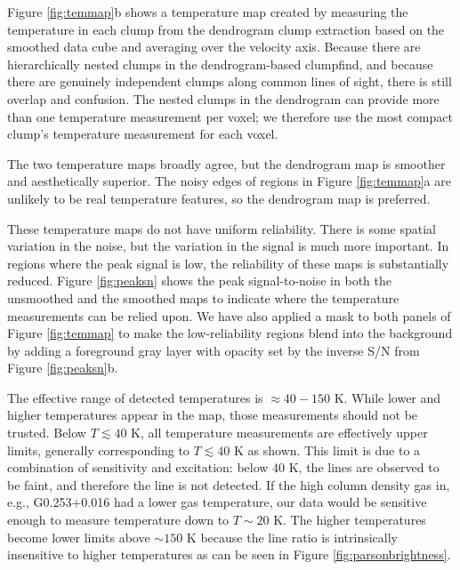 Figure \ref{fig:temmap}b shows a temperature map created by measuring the
temperature in each clump from the dendrogram clump extraction based on the
smoothed data cube and averaging over the velocity axis.  Because there are
hierarchically nested clumps in the dendrogram-based clumpfind, and because
there are genuinely independent clumps along common lines of sight, there is
still overlap and confusion.  The nested clumps in the dendrogram can provide
more than one temperature measurement per voxel; we therefore use the most
compact clump's temperature measurement for each voxel.

The two temperature maps broadly agree, but the dendrogram map is smoother and
aesthetically superior.  The noisy edges of regions in Figure \ref{fig:temmap}a
are unlikely to be real temperature features, so the dendrogram map is
preferred.

These temperature maps do not have uniform reliability.  There
is some spatial variation in the noise, but the variation in the signal is much
more important.  In regions where the peak signal is low, the reliability of
these maps is substantially reduced.  Figure \ref{fig:peaksn} shows the peak
signal-to-noise in both the unsmoothed and the smoothed maps to indicate where
the temperature measurements can be relied upon.  We have also applied a mask
to both panels of Figure \ref{fig:temmap} to make the low-reliability regions
blend into the background by adding a foreground gray layer with opacity set by
the inverse S/N from Figure \ref{fig:peaksn}b.

The effective range of detected temperatures is $\approx40-150$ K. While lower
and higher temperatures appear in the map, those measurements should not be
trusted.  Below $T\lesssim40$ K, all temperature measurements are effectively
upper limits, generally corresponding to $T\lesssim40$ K as shown.  This limit
is due to a combination of sensitivity and excitation: below 40 K, the \para
lines are observed to be faint, and therefore the \threetwoone line is not
detected.  If the high column density gas in, e.g., G0.253+0.016 had a lower
gas temperature, our data would be sensitive enough to measure temperature down
to $T\sim20$ K.  The higher temperatures become lower limits above $\sim150$ K
because the \para line ratio is intrinsically insensitive to higher
temperatures as can be seen in Figure \ref{fig:parsonbrightness}.

